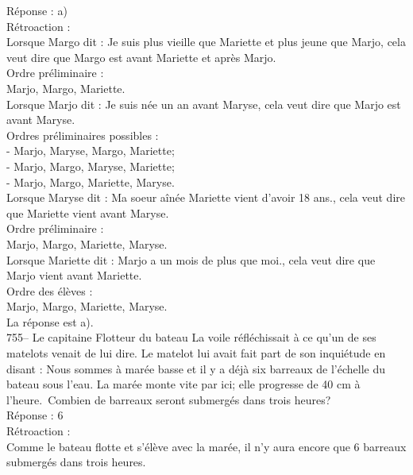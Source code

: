 ﻿\documentclass[letterpaper, 12pt]{article}
\begin{document}
R\'eponse : a)\\

R\'etroaction : \\
Lorsque Margo dit : \og Je suis plus vieille que Mariette et plus
jeune que Marjo\fg , cela veut dire que Margo est avant Mariette et
apr\`es Marjo.\\

Ordre pr\'eliminaire :\\
Marjo, Margo, Mariette.\\

Lorsque Marjo dit : \og Je suis n\'ee un an avant Maryse\fg , cela
veut dire que Marjo est avant Maryse.\\

Ordres pr\'eliminaires possibles :\\
- Marjo, Maryse, Margo, Mariette;\\
- Marjo, Margo, Maryse, Mariette;\\
- Marjo, Margo, Mariette, Maryse.\\

Lorsque Maryse dit : \og Ma soeur a\^in\'ee Mariette vient d'avoir
18 ans.\fg , cela veut dire  que Mariette vient avant Maryse.\\

Ordre pr\'eliminaire :\\
Marjo, Margo, Mariette, Maryse.\\

Lorsque Mariette dit : \og Marjo a un mois de plus que moi.\fg ,
cela veut dire que Marjo vient avant Mariette.\\

Ordre des \'el\`eves :\\
Marjo, Margo, Mariette, Maryse.\\

La r\'eponse est a).\\

755-- Le capitaine Flotteur du bateau La voile r\'efl\'echissait \`a
ce qu'un de ses matelots venait de lui dire.  Le matelot lui avait
fait part de son inqui\'etude en disant : \og Nous sommes \`a
mar\'ee basse et il y a d\'ej\`a  six barreaux de l'\'echelle du
bateau sous l'eau.  La mar\'ee monte vite par ici; elle progresse de
40 cm \`a l'heure.\fg\  Combien de
barreaux seront submerg\'es dans trois heures?\\


R\'eponse : 6\\

R\'etroaction : \\
Comme le bateau flotte et s'\'el\`eve avec la mar\'ee, il n'y aura encore
que 6 barreaux submerg\'es dans trois heures.\\
\end{document}
